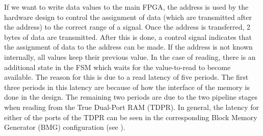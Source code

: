 If we want to write data values to the main FPGA, the address is used by the hardware design to control the assignment of data (which are transmitted after the address) to the correct range of a signal.
Once the address is transferred, 2 bytes of data are transmitted.
After this is done, a control signal indicates that the assignment of data to the address can be made. 
If the address is not known internally, all values keep their previous value.
In the case of reading, there is an additional state in the FSM which waits for the value-to-read to become available.
The reason for this is due to a read latency of five periods.
The first three periods in this latency are because of how the interface of the memory is done in the {\fourq} design.
The remaining two periods are due to the two pipeline stages when reading from the True Dual-Port RAM (TDPR).
In general, the latency for either of the ports of the TDPR can be seen in the corresponding Block Memory Generator (BMG) configuration (see ).
